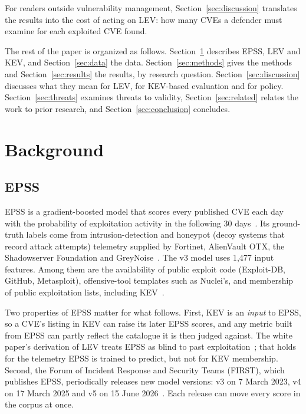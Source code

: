 For readers outside vulnerability management, Section~\ref{sec:discussion}
translates the results into the cost of acting on LEV: how many CVEs a
defender must examine for each exploited CVE found.

The rest of the paper is organized as follows. Section~\ref{sec:background}
describes EPSS, LEV and KEV, and Section~\ref{sec:data} the data.
Section~\ref{sec:methods} gives the methods and Section~\ref{sec:results} the
results, by research question. Section~\ref{sec:discussion} discusses what
they mean for LEV, for KEV-based evaluation and for policy.
Section~\ref{sec:threats} examines threats to validity,
Section~\ref{sec:related} relates the work to prior research, and
Section~\ref{sec:conclusion} concludes.

\section{Background}\label{sec:background}

\subsection{EPSS}

EPSS is a gradient-boosted model that scores every published CVE each day with
the probability of exploitation activity in the following 30
days~\cite{jacobs2021epss,jacobs2023epssv3}. Its ground-truth labels come from
intrusion-detection and honeypot (decoy systems that record attack attempts)
telemetry supplied by Fortinet, AlienVault
OTX, the Shadowserver Foundation and GreyNoise~\cite{jacobs2023epssv3}. The v3
model uses 1,477 input features. Among them are the availability of public
exploit code (Exploit-DB, GitHub, Metasploit), offensive-tool templates such as
Nuclei's, and membership of public exploitation lists, including
KEV~\cite{jacobs2023epssv3}.

Two properties of EPSS matter for what follows. First, KEV is an \emph{input}
to EPSS, so a CVE's listing in KEV can raise its later EPSS scores, and any
metric built from EPSS can partly reflect the catalogue it is then judged
against. The white paper's derivation of LEV treats EPSS as blind to past
exploitation~\cite[Sec.~5.1]{mell2025lev}; that holds for the telemetry EPSS is
trained to predict, but not for KEV membership. Second, the Forum of Incident Response and Security Teams (FIRST),
which publishes EPSS, periodically releases new model versions: v3 on
7 March 2023, v4 on 17 March 2025 and v5 on 15 June
2026~\cite{epss2026releases}. Each release can move every score in the corpus
at once.

